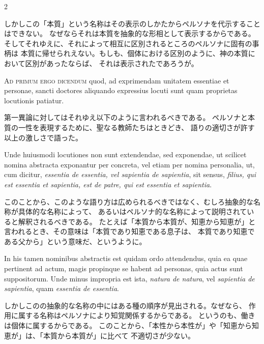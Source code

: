 \documentclass[paper=a4paper,fontsize=10pt,jafontsize=9pt,titlepage]{jlreq}
\begin{document}
\begin{paracol}{2}
\switchcolumn

しかしこの「本質」という名称はその表示のしかたからペルソナを代示することはできない。
なぜならそれは本質を抽象的な形相として表示するからである。
そしてそれゆえに、それによって相互に区別されるところのペルソナに固有の事柄は
本質に帰せられえない。もしも、個体における区別のように、神の本質において区別があったならば、
それは表示されたであろうが。

\switchcolumn*

\textsc{Ad primum ergo dicendum} quod, ad exprimendam unitatem essentiae et personae,
sancti doctores aliquando expressius locuti sunt quam proprietas locutionis
patiatur.

\switchcolumn

第一異論に対してはそれゆえ以下のように言われるべきである。
ペルソナと本質の一性を表現するために、聖なる教師たちはときどき、
語りの適切さが許す以上の激しさで語った。

\switchcolumn*

Unde huiusmodi locutiones non sunt extendendae, sed exponendae, ut
scilicet nomina abstracta exponantur per concreta, vel etiam per nomina
personalia, ut, cum dicitur, \textit{essentia de essentia, vel sapientia de sapientia},
sit sensus, \textit{filius, qui est essentia et sapientia, est de patre, qui est
essentia et sapientia}.

\switchcolumn

このことから、このような語り方は広められるべきではなく、むしろ抽象的な名称が具体的な名称によって、
あるいはペルソナ的な名称によって説明されていると解釈されるべきである。
たとえば「本質から本質が、知恵から知恵が」と言われるとき、その意味は「本質であり知恵である息子は、
本質であり知恵である父から」という意味だ、というように。

\switchcolumn*

In his tamen nominibus abstractis est quidam ordo
attendendus, quia ea quae pertinent ad actum, magis propinque se habent ad
personas, quia actus sunt suppositorum. Unde minus impropria est ista, \textit{natura
de natura}, vel \textit{sapientia de sapientia}, quam \textit{essentia de essentia}.

\switchcolumn

しかしこのの抽象的な名称の中にはある種の順序が見出される。なぜなら、
作用に属する名称はペルソナにより知覚関係するからである。
というのも、働きは個体に属するからである。
このことから、「本性から本性が」や「知恵から知恵が」は、「本質から本質が」に比べて
不適切さが少ない。

\switchcolumn*


\end{paracol}
\end{document}
